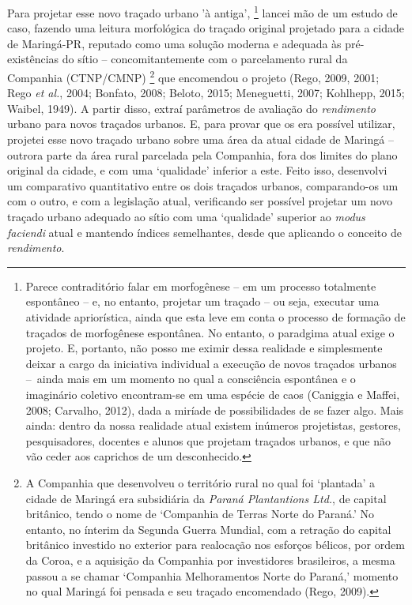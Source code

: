 \documentclass[]{report}
\begin{document}
	Para projetar esse novo traçado urbano 'à antiga',
		\footnote[2]{Parece contraditório falar em morfogênese – em um processo totalmente espontâneo – e, no entanto, projetar um traçado – ou seja, executar uma atividade apriorística, ainda que esta leve em conta o processo de formação de traçados de morfogênese espontânea. No entanto, o paradgima atual exige o projeto. E, portanto, não posso me eximir dessa realidade e simplesmente deixar a cargo da iniciativa individual a execução de novos traçados urbanos – ainda mais em um momento no qual a consciência espontânea e o imaginário coletivo encontram-se em uma espécie de caos (Caniggia e Maffei, 2008; Carvalho, 2012), dada a miríade de possibilidades de se fazer algo. Mais ainda: dentro da nossa realidade atual existem inúmeros projetistas, gestores, pesquisadores, docentes e alunos que projetam traçados urbanos, e que não vão ceder aos caprichos de um desconhecido.} 
	lancei mão de um estudo de caso, fazendo uma leitura morfológica do traçado original projetado para a cidade de Maringá-PR, reputado como uma solução moderna e adequada às pré-existências do sítio – concomitantemente com o parcelamento rural da Companhia (CTNP/CMNP)
		\footnote[3]{A Companhia que desenvolveu o território rural no qual foi `plantada' a cidade de Maringá era subsidiária da \textit{Paraná Plantantions Ltd.}, de capital britânico, tendo o nome de `Companhia de Terras Norte do Paraná.' No entanto, no ínterim da Segunda Guerra Mundial, com a retração do capital britânico investido no exterior para realocação nos esforços bélicos, por ordem da Coroa, e a aquisição da Companhia por investidores brasileiros, a mesma passou a se chamar `Companhia Melhoramentos Norte do Paraná,' momento no qual Maringá foi pensada e seu traçado encomendado (Rego, 2009).} 
	que encomendou o projeto (Rego, 2009, 2001; Rego \textit{et al.}, 2004; Bonfato, 2008; Beloto, 2015; Meneguetti, 2007; Kohlhepp, 2015; Waibel, 1949). A partir disso, extraí parâmetros de avaliação do \textit{rendimento} urbano para novos traçados urbanos. E, para provar que os era possível utilizar, projetei esse novo traçado urbano sobre uma área da atual cidade de Maringá – outrora parte da área rural parcelada pela Companhia, fora dos limites do plano original da cidade, e com uma `qualidade' inferior a este. Feito isso, desenvolvi um comparativo quantitativo entre os dois traçados urbanos, comparando-os um com o outro, e com a legislação atual, verificando ser possível projetar um novo traçado urbano adequado ao sítio com uma `qualidade' superior ao \textit{modus faciendi} atual e mantendo índices semelhantes, desde que aplicando o conceito de \textit{rendimento}.
\end{document}
